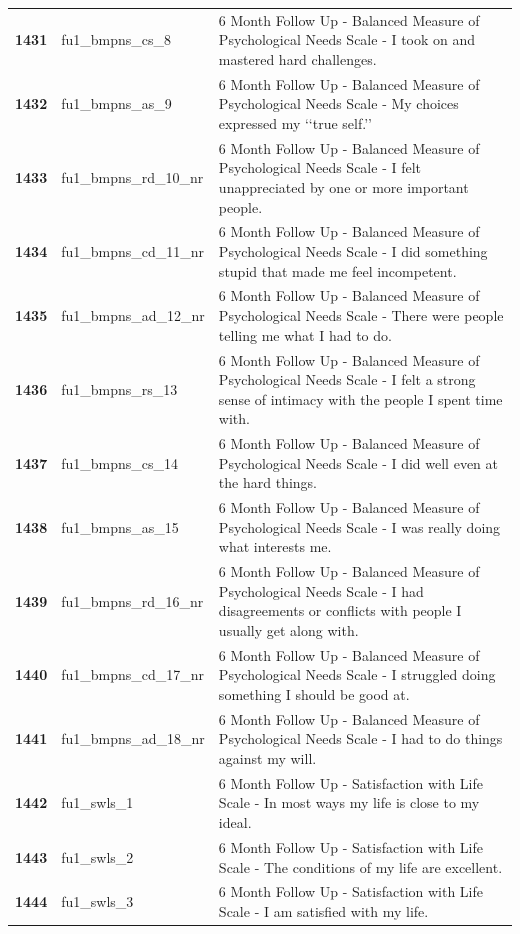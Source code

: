 \documentclass[
  letterpaper,
  DIV=11,
  numbers=noendperiod]{scrartcl}
\begin{document}
\begin{longtable}[t]{>{}cll}
\addlinespace
\textbf{1431} & fu1\_bmpns\_cs\_8 & 6 Month Follow Up - Balanced Measure of Psychological Needs Scale - I took on and mastered hard challenges.\\
\textbf{1432} & fu1\_bmpns\_as\_9 & 6 Month Follow Up - Balanced Measure of Psychological Needs Scale - My choices expressed my ‘‘true self.’’\\
\textbf{1433} & fu1\_bmpns\_rd\_10\_nr & 6 Month Follow Up - Balanced Measure of Psychological Needs Scale - I felt unappreciated by one or more important people.\\
\textbf{1434} & fu1\_bmpns\_cd\_11\_nr & 6 Month Follow Up - Balanced Measure of Psychological Needs Scale - I did something stupid that made me feel incompetent.\\
\textbf{1435} & fu1\_bmpns\_ad\_12\_nr & 6 Month Follow Up - Balanced Measure of Psychological Needs Scale - There were people telling me what I had to do.\\
\addlinespace
\textbf{1436} & fu1\_bmpns\_rs\_13 & 6 Month Follow Up - Balanced Measure of Psychological Needs Scale - I felt a strong sense of intimacy with the people I spent time with.\\
\textbf{1437} & fu1\_bmpns\_cs\_14 & 6 Month Follow Up - Balanced Measure of Psychological Needs Scale - I did well even at the hard things.\\
\textbf{1438} & fu1\_bmpns\_as\_15 & 6 Month Follow Up - Balanced Measure of Psychological Needs Scale - I was really doing what interests me.\\
\textbf{1439} & fu1\_bmpns\_rd\_16\_nr & 6 Month Follow Up - Balanced Measure of Psychological Needs Scale - I had disagreements or conflicts with people I usually get along with.\\
\textbf{1440} & fu1\_bmpns\_cd\_17\_nr & 6 Month Follow Up - Balanced Measure of Psychological Needs Scale - I struggled doing something I should be good at.\\
\addlinespace
\textbf{1441} & fu1\_bmpns\_ad\_18\_nr & 6 Month Follow Up - Balanced Measure of Psychological Needs Scale - I had to do things against my will.\\
\textbf{1442} & fu1\_swls\_1 & 6 Month Follow Up - Satisfaction with Life Scale - In most ways my life is close to my ideal.\\
\textbf{1443} & fu1\_swls\_2 & 6 Month Follow Up - Satisfaction with Life Scale - The conditions of my life are excellent.\\
\textbf{1444} & fu1\_swls\_3 & 6 Month Follow Up - Satisfaction with Life Scale - I am satisfied with my life.\\

\end{longtable}
\end{document}
